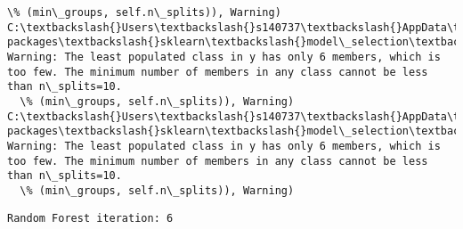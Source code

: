 \documentclass[11pt]{article}
\begin{document}
\begin{Verbatim}[commandchars=\\\{\}]
  \% (min\_groups, self.n\_splits)), Warning)
C:\textbackslash{}Users\textbackslash{}s140737\textbackslash{}AppData\textbackslash{}Local\textbackslash{}Continuum\textbackslash{}anaconda3\textbackslash{}lib\textbackslash{}site-packages\textbackslash{}sklearn\textbackslash{}model\_selection\textbackslash{}\_split.py:605: Warning: The least populated class in y has only 6 members, which is too few. The minimum number of members in any class cannot be less than n\_splits=10.
  \% (min\_groups, self.n\_splits)), Warning)
C:\textbackslash{}Users\textbackslash{}s140737\textbackslash{}AppData\textbackslash{}Local\textbackslash{}Continuum\textbackslash{}anaconda3\textbackslash{}lib\textbackslash{}site-packages\textbackslash{}sklearn\textbackslash{}model\_selection\textbackslash{}\_split.py:605: Warning: The least populated class in y has only 6 members, which is too few. The minimum number of members in any class cannot be less than n\_splits=10.
  \% (min\_groups, self.n\_splits)), Warning)

    \end{Verbatim}

    \begin{Verbatim}[commandchars=\\\{\}]
Random Forest iteration: 6 

    \end{Verbatim}
\end{document}
